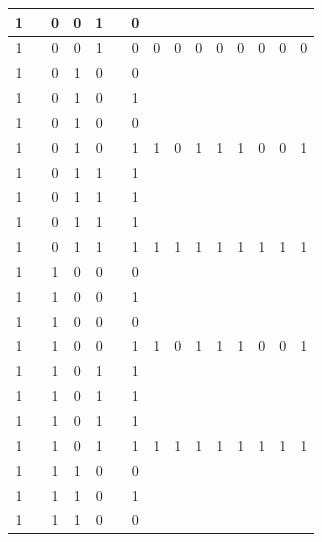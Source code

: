 \begin{table}[!tb]
\begin{tabular}{|c|c|c|c|c|c|c|c|c|c|c|c|c|c|c|}
        \rowcolor{yellow!40} 1 &  & 0 & 0 & 1 &  & 0 &  &  &  &  &  &  &  &  \\ \hline
        \rowcolor{yellow!40} 1 &  & 0 & 0 & 1 &  & 0 & 0 & 0 & 0 & 0 & 0 & 0 & 0 & 0 \\ \hline
        \rowcolor{gray!40} 1 &  & 0 & 1 & 0 &  & 0 &  &  &  &  &  &  &  &  \\ \hline
        \rowcolor{gray!40} 1 &  & 0 & 1 & 0 &  & 1 &  &  &  &  &  &  &  &  \\ \hline
        \rowcolor{gray!40} 1 &  & 0 & 1 & 0 &  & 0 &  &  &  &  &  &  &  &  \\ \hline
        \rowcolor{gray!40} 1 &  & 0 & 1 & 0 &  & 1 & 1 & 0 & 1 & 1 & 1 & 0 & 0 & 1 \\ \hline
        \rowcolor{blue!40} 1 &  & 0 & 1 & 1 &  & 1 &  &  &  &  &  &  &  &  \\ \hline
        \rowcolor{blue!40} 1 &  & 0 & 1 & 1 &  & 1 &  &  &  &  &  &  &  &  \\ \hline
        \rowcolor{blue!40} 1 &  & 0 & 1 & 1 &  & 1 &  &  &  &  &  &  &  &  \\ \hline
        \rowcolor{blue!40} 1 &  & 0 & 1 & 1 &  & 1 & 1 & 1 & 1 & 1 & 1 & 1 & 1 & 1 \\ \hline
        \rowcolor{red!40} 1 &  & 1 & 0 & 0 &  & 0 &  &  &  &  &  &  &  &  \\ \hline
        \rowcolor{red!40} 1 &  & 1 & 0 & 0 &  & 1 &  &  &  &  &  &  &  &  \\ \hline
        \rowcolor{red!40} 1 &  & 1 & 0 & 0 &  & 0 &  &  &  &  &  &  &  &  \\ \hline
        \rowcolor{red!40} 1 &  & 1 & 0 & 0 &  & 1 & 1 & 0 & 1 & 1 & 1 & 0 & 0 & 1 \\ \hline
        \rowcolor{green!40} 1 &  & 1 & 0 & 1 &  & 1 &  &  &  &  &  &  &  &  \\ \hline
        \rowcolor{green!40} 1 &  & 1 & 0 & 1 &  & 1 &  &  &  &  &  &  &  &  \\ \hline
        \rowcolor{green!40} 1 &  & 1 & 0 & 1 &  & 1 &  &  &  &  &  &  &  &  \\ \hline
        \rowcolor{green!40} 1 &  & 1 & 0 & 1 &  & 1 & 1 & 1 & 1 & 1 & 1 & 1 & 1 & 1 \\ \hline
        \rowcolor{yellow!40} 1 &  & 1 & 1 & 0 &  & 0 &  &  &  &  &  &  &  &  \\ \hline
        \rowcolor{yellow!40} 1 &  & 1 & 1 & 0 &  & 1 &  &  &  &  &  &  &  &  \\ \hline
        \rowcolor{yellow!40} 1 &  & 1 & 1 & 0 &  & 0 &  &  &  &  &  &  &  &  \\ \hline

\end{tabular}
\end{table}

